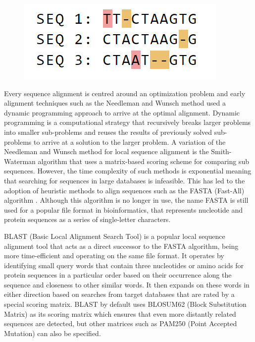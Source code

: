 \begin{figure}
  \centering
  \includegraphics[width=.45\linewidth]{images/ch_2_sequence_alignment_multi.PNG}
  \label{fig:ch_2_sequence_alignment_multi}
\end{figure}


Every sequence alignment is centred around an optimization problem and early alignment techniques such as the Needleman and Wunsch method \cite{needleman1970general} used a dynamic programming approach to arrive at the optimal alignment. Dynamic programming is a computational strategy that recursively breaks larger problems into smaller sub-problems and reuses the results of previously solved sub-problems to arrive at a solution to the larger problem. A variation of the Needleman and Wunsch method for local sequence alignment is the Smith-Waterman algorithm\cite{smith1981identification} that uses a matrix-based scoring scheme for comparing sub sequences.
However, the time complexity of such methods is exponential meaning that searching for sequences in large databases is infeasible. This has led to the adoption of heuristic methods to align sequences such as the FASTA (Fast-All) algorithm \cite{lipman1985rapid}. Although this algorithm is no longer in use, the name FASTA is still used for a popular file format in bioinformatics, that represents nucleotide and protein sequences as a series of single-letter characters.

BLAST (Basic Local Alignment Search Tool) is a popular local sequence alignment tool that acts as a direct successor to the FASTA algorithm, being more time-efficient and operating on the same file format\cite{pertsemlidis2001having}. It operates by identifying small query words that contain three nucleotides or amino acids for protein sequences in a particular order based on their occurrence along the sequence and closeness to other similar words. It then expands on these words in  either direction based on searches from target databases that are rated by a special scoring matrix. BLAST by default uses BLOSUM62 (Block Substitution Matrix) as its scoring matrix which ensures that even more distantly related sequences are detected, but other matrices such as PAM250 (Point Accepted Mutation) can also be specified.




